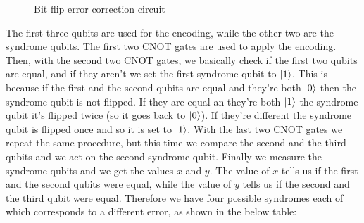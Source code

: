 \documentclass{article}
\begin{document}
	\begin{figure}[H]
	\centering
	\caption{Bit flip error correction circuit}
	\end{figure}
	\noindent The first three qubits are used for the encoding, while the other two are the syndrome qubits. The first two CNOT gates are used to apply the encoding. Then, with the second two CNOT gates, we basically check if the first two qubits are equal, and if they aren't we set the first syndrome qubit to $\ket{1}$. This is because if the first and the second qubits are equal and they're both $\ket{0}$ then the syndrome qubit is not flipped. If they are equal an they're both $\ket{1}$ the syndrome qubit it's flipped twice (so it goes back to $\ket{0}$). If they're different the syndrome qubit is flipped once and so it is set to $\ket{1}$. With the last two CNOT gates we repeat the same procedure, but this time we compare the second and the third qubits and we act on the second syndrome qubit. Finally we measure the syndrome qubits and we get the values $x$ and $y$. The value of $x$ tells us if the first and the second qubits were equal, while the value of $y$ tells us if the second and the third qubit were equal. Therefore we have four possible syndromes each of which corresponds to a different error, as shown in the below table:
\end{document}
